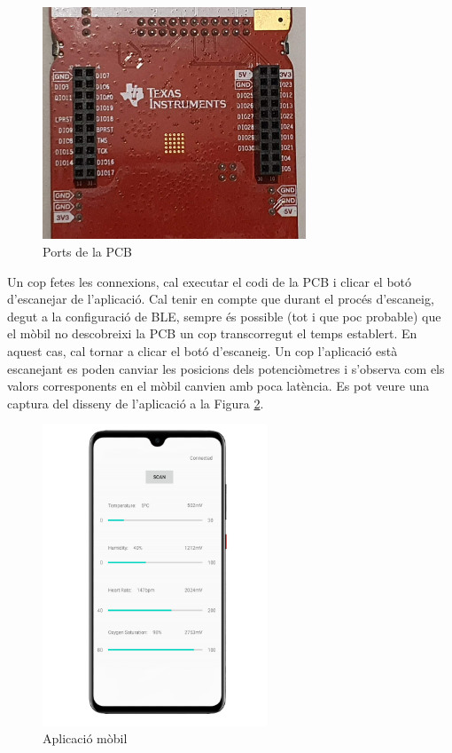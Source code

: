\begin{figure}[h]
	\begin{center}
		\includegraphics[angle=90, width=0.7\textwidth]{./images/connexions_placa.jpg}
		\caption{Ports de la PCB}
		\label{ports_placa}
	\end{center}
\end{figure}

Un cop fetes les connexions, cal executar el codi de la PCB i clicar el botó d'escanejar de l'aplicació.
Cal tenir en compte que durant el procés d'escaneig, degut a la configuració de BLE, sempre és possible (tot i que poc probable) que el mòbil no descobreixi la PCB un cop transcorregut el temps establert.
En aquest cas, cal tornar a clicar el botó d'escaneig.
Un cop l'aplicació està escanejant es poden canviar les posicions dels potenciòmetres i s'observa com els valors corresponents en el mòbil canvien amb poca latència.
Es pot veure una captura del disseny de l'aplicació a la Figura \ref{captura_app}.

\begin{figure}[h!]
	\begin{center}
		\includegraphics[width=0.6\textwidth]{./images/captura_app_borde.png}
		\caption{Aplicació mòbil}
		\label{captura_app}
	\end{center}
\end{figure}

